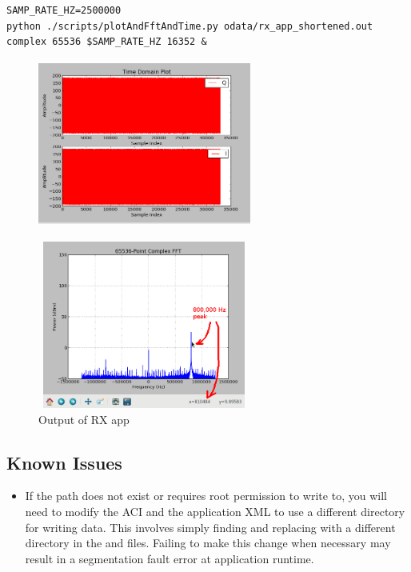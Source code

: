 \begin{lstlisting}
SAMP_RATE_HZ=2500000
python ./scripts/plotAndFftAndTime.py odata/rx_app_shortened.out complex 65536 $SAMP_RATE_HZ 16352 &
\end{lstlisting}
        \begin{figure}[H]
        \begin{minipage}{.5\textwidth}
                \includegraphics[width=7cm,height=5.5cm,keepaspectratio]{rx_app_sig_gen_time_domain}
                \label{fig:rx_app_sig_gen_time_domain}
        \end{minipage}%
        \begin{minipage}{.5\textwidth}
                \includegraphics[width=7cm,height=5.5cm,keepaspectratio]{rx_app_sig_gen_fft_800k}
        \end{minipage}
                \caption{Output of RX app}
                \label{fig:rx_app_sig_gen_fft}
        \end{figure}
\subsection{Known Issues}
\noindent
\begin{itemize}
  \item If the path  does not exist or requires root permission to write to, you will need to modify the ACI and the application XML to use a different directory for writing data. This involves simply finding and replacing  with a different directory in the  and  files. Failing to make this change when necessary may result in a segmentation fault error at application runtime.
\end{itemize}
